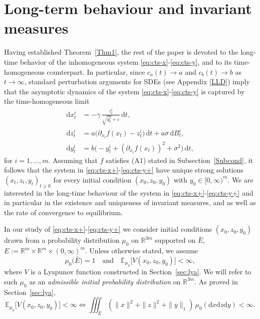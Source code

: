 \documentclass[11pt, a4paper,leqno]{amsart}
\theoremstyle{definition}
\numberwithin{equation}{section}
\newcommand{\R}{\mathbb R}
\begin{document}
\section{Long-term behaviour and invariant measures}\label{Invar}
Having established Theorem~\ref{Thm1}, the rest of the paper is devoted to the long-time behavior of the
inhomogeneous system \eqref{eq:cts-x}-\eqref{eq:cts-y}, and to its time-homogeneous  counterpart. In particular, since $c_a(t)\to a$ and $c_b(t)\to b$ as $t\to\infty$, standard perturbation arguments for SDEs
(see Appendix \ref{LLD}) imply that the asymptotic dynamics of the system \eqref{eq:cts-x}-\eqref{eq:cts-y} is captured by the
time-homogeneous limit
\begin{align}
\mathrm{d} x_t^i &= -\gamma\,\frac{ z_t^i}{\sqrt{ y_t^i}+\varepsilon}\,\mathrm{d}t, \label{eq:cts-x+}\\
\mathrm{d} z_t^i &= a\bigl(\partial_{x_i}f( x_t)- z_t^i\bigr)\,\mathrm{d}t + a\sigma\,\mathrm{d}B_t^i, \label{eq:cts-z+}\\
\mathrm{d} y_t^i &= b\bigl(- y_t^i + (\partial_{x_i}f( x_t))^2 + \sigma^2\bigr)\,\mathrm{d}t, \label{eq:cts-y+}
\end{align}
for $i=1,\dots,m$. Assuming that $f$ satisfies \textnormal{(A1)} stated in Subsection~\ref{Subcond},
it follows that the system in  \eqref{eq:cts-x+}-\eqref{eq:cts-y+}
have unique strong solutions $(x_t, z_t, y_t)_{t\ge0}$ for every initial condition
$(x_0, z_0, y_0)$ with $y_0\in[0,\infty)^m$. We are interested in the long-time behaviour of the system in \eqref{eq:cts-x+}-\eqref{eq:cts-y+}  and in particular in the existence and uniqueness of invariant measures, and as well as the rate of convergence to equilibrium.






In our study of \eqref{eq:cts-x+}-\eqref{eq:cts-y+} we consider initial conditions $(x_0,z_0,y_0)$ drawn from a probability
distribution $\mu_0$ on $\R^{3m}$ supported on $\bar E$, $E:=\R^m\times\R^m\times(0,\infty)^m$.  Unless otherwise stated, we assume
\begin{equation}\label{intimeasure}
\mu_0\big(\bar E\big)=1
\quad\text{and}\quad
\mathbb{E}_{\mu_0}\!\big [V(x_0,z_0,y_0)\big]<\infty,
\end{equation}
where $V$ is a Lyapunov function constructed in Section~\ref{sec:lya}.  We will refer to such $\mu_0$ as an \emph{admissible initial probability distribution} on $\R^{3m}$. As proved in Section~\ref{sec:lya},
\begin{equation}\label{intimeasureapa}
\mathbb{E}_{\mu_0}\!\big [V(x_0,z_0,y_0)\big]<\infty\Leftrightarrow \iiint_E (\|x\|^2+\|z\|^2+\|y\|_1)\,\mu_0(\mathrm d x\mathrm d z\mathrm d y)<\infty.
\end{equation}
\end{document}

